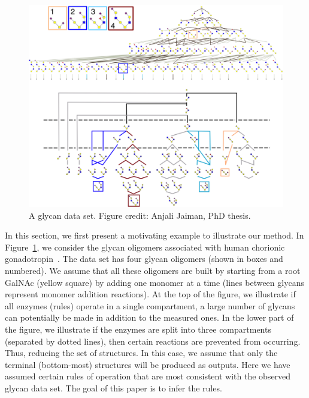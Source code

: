 \begin{figure}[t]
\centering
\includegraphics[width=1\linewidth]{gfig2.png}
\caption{A glycan data set. Figure credit: Anjali Jaiman, PhD thesis.}

\label{fig:dataset-gly}
\vspace{7.5mm}
\end{figure}



In this section, we first present a motivating example to illustrate our method.
In Figure~\ref{fig:dataset-gly},
we consider the glycan oligomers associated with human chorionic
gonadotropin~\cite{Harrd1992}.
The data set has four glycan oligomers (shown in boxes and numbered). We assume that all these oligomers
are built by starting from a root GalNAc (yellow square) by adding one monomer at a
time (lines between glycans represent monomer addition reactions). At the top of the figure, we illustrate
if all enzymes (rules) operate in a
single compartment, a large number of glycans can potentially be made in addition to the measured ones.
In the lower part of the figure, we illustrate if the enzymes are split into three compartments
(separated by dotted lines), then certain reactions are prevented from occurring. Thus, reducing the set of structures.
In this case, we assume that only the terminal (bottom-most) structures will be produced as outputs.
Here we have assumed certain rules of operation that are most consistent with the observed glycan data set.
The goal of this paper is to infer the rules.

